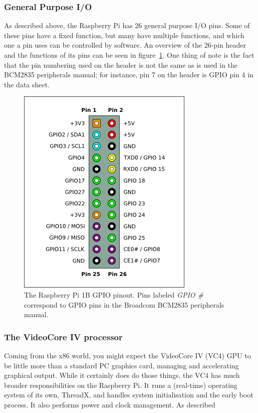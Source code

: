 \documentclass[twoside]{uva-inf-bachelor-thesis}
\begin{document}
\subsubsection{General Purpose I/O}
As described above, the Raspberry Pi has 26 general purpose I/O pins. Some of these pins have a fixed function, but many have multiple functions, and which one a pin uses can be controlled by software. An overview of the 26-pin header and the functions of its pins can be seen in figure~\ref{fig:gpiopinout}. One thing of note is the fact that the pin numbering used on the header is not the same as is used in the BCM2835 peripherals manual; for instance, pin 7 on the header is GPIO pin 4 in the data sheet.

\begin{figure}[ht]
    \centering
    \includegraphics[scale=0.65]{Pi-GPIO-header-26-sm.png}
    \caption{The Raspberry Pi 1B GPIO pinout. Pins labeled \textit{GPIO \#} correspond to GPIO pins in the Broadcom BCM2835 peripherals manual\cite{bcm:2835peripherals}.}
    \label{fig:gpiopinout}
\end{figure}

\subsubsection{The VideoCore IV processor}
Coming from the x86 world, you might expect the VideoCore IV (VC4) GPU to be little more than a standard PC graphics card, managing and accelerating graphical output. While it certainly does do those things, the VC4 has much broader responsibilities on the Raspberry Pi. It runs a (real-time) operating system of its own, ThreadX\cite{rpi:opensourcevpu}, and handles system initialisation and the early boot process\cite{rpi:bootforum}. It also performs power and clock management\cite{rpi:gpuclockpower}. As described 
\end{document}
